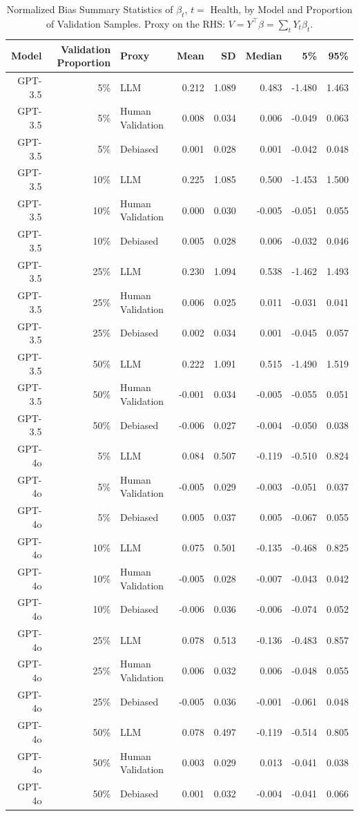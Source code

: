 \begin{table}

\caption{Normalized Bias Summary Statistics of $\beta_{t}$, $t=$ Health, by Model and Proportion of Validation Samples.
      Proxy on the RHS: $V = Y^\top \beta = \sum_{t} Y_t \beta_t$.}
\centering
\begin{tabular}[t]{rrlrrrrr}
\toprule
Model & Validation Proportion & Proxy & Mean & SD & Median & 5\% & 95\%\\
\midrule
GPT-3.5 & 5\% & LLM & 0.212 & 1.089 & 0.483 & -1.480 & 1.463\\
GPT-3.5 & 5\% & Human Validation & 0.008 & 0.034 & 0.006 & -0.049 & 0.063\\
GPT-3.5 & 5\% & Debiased & 0.001 & 0.028 & 0.001 & -0.042 & 0.048\\
GPT-3.5 & 10\% & LLM & 0.225 & 1.085 & 0.500 & -1.453 & 1.500\\
GPT-3.5 & 10\% & Human Validation & 0.000 & 0.030 & -0.005 & -0.051 & 0.055\\
GPT-3.5 & 10\% & Debiased & 0.005 & 0.028 & 0.006 & -0.032 & 0.046\\
GPT-3.5 & 25\% & LLM & 0.230 & 1.094 & 0.538 & -1.462 & 1.493\\
GPT-3.5 & 25\% & Human Validation & 0.006 & 0.025 & 0.011 & -0.031 & 0.041\\
GPT-3.5 & 25\% & Debiased & 0.002 & 0.034 & 0.001 & -0.045 & 0.057\\
GPT-3.5 & 50\% & LLM & 0.222 & 1.091 & 0.515 & -1.490 & 1.519\\
GPT-3.5 & 50\% & Human Validation & -0.001 & 0.034 & -0.005 & -0.055 & 0.051\\
GPT-3.5 & 50\% & Debiased & -0.006 & 0.027 & -0.004 & -0.050 & 0.038\\
GPT-4o & 5\% & LLM & 0.084 & 0.507 & -0.119 & -0.510 & 0.824\\
GPT-4o & 5\% & Human Validation & -0.005 & 0.029 & -0.003 & -0.051 & 0.037\\
GPT-4o & 5\% & Debiased & 0.005 & 0.037 & 0.005 & -0.067 & 0.055\\
GPT-4o & 10\% & LLM & 0.075 & 0.501 & -0.135 & -0.468 & 0.825\\
GPT-4o & 10\% & Human Validation & -0.005 & 0.028 & -0.007 & -0.043 & 0.042\\
GPT-4o & 10\% & Debiased & -0.006 & 0.036 & -0.006 & -0.074 & 0.052\\
GPT-4o & 25\% & LLM & 0.078 & 0.513 & -0.136 & -0.483 & 0.857\\
GPT-4o & 25\% & Human Validation & 0.006 & 0.032 & 0.006 & -0.048 & 0.055\\
GPT-4o & 25\% & Debiased & -0.005 & 0.036 & -0.001 & -0.061 & 0.048\\
GPT-4o & 50\% & LLM & 0.078 & 0.497 & -0.119 & -0.514 & 0.805\\
GPT-4o & 50\% & Human Validation & 0.003 & 0.029 & 0.013 & -0.041 & 0.038\\
GPT-4o & 50\% & Debiased & 0.001 & 0.032 & -0.004 & -0.041 & 0.066\\
\bottomrule
\end{tabular}
\end{table}
